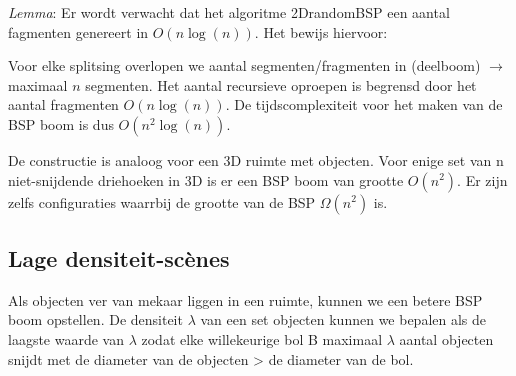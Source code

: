 \documentclass[12pt,a4paper]{article}
\begin{document}
	\textit{Lemma}: Er wordt verwacht dat het algoritme 2DrandomBSP een aantal fagmenten genereert in $O(n\log(n))$. Het bewijs hiervoor: 
	\begin{figure}[H]
		\centering
		\label{fig:BSP-constructie}
	\end{figure}

	Voor elke splitsing overlopen we aantal segmenten/fragmenten in (deelboom) $\rightarrow$ maximaal $n$ segmenten. Het aantal recursieve oproepen is begrensd door het aantal fragmenten $O(n\log(n))$. De tijdscomplexiteit voor het maken van de BSP boom is dus $O(n^2\log(n))$. 
	
	De constructie is analoog voor een 3D ruimte met objecten. Voor enige set van n niet-snijdende driehoeken in 3D is er een BSP boom van grootte $O(n^2)$. Er zijn zelfs configuraties waarrbij de grootte van de BSP $\Omega(n^2)$ is. 
	
	\subsection{Lage densiteit-scènes}
	Als objecten ver van mekaar liggen in een ruimte, kunnen we een betere BSP boom opstellen. De densiteit $\lambda$ van een set objecten kunnen we bepalen als de laagste waarde van $\lambda$ zodat elke willekeurige bol B maximaal $\lambda$ aantal objecten snijdt met de diameter van de objecten > de diameter van de bol. 
	
\end{document}
